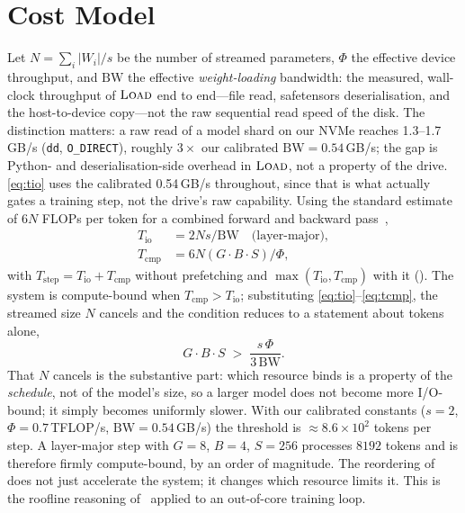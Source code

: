 \documentclass[journal]{IEEEtran}
\begin{document}
\section{Cost Model}
\label{sec:cost}

Let $N = \sum_i |W_i| / s$ be the number of streamed parameters, $\Phi$ the effective device
throughput, and $\mathrm{BW}$ the effective \emph{weight-loading} bandwidth: the measured, wall-clock
throughput of $\textsc{Load}$ end to end---file read, safetensors deserialisation, and the
host-to-device copy---not the raw sequential read speed of the disk. The distinction matters: a raw
read of a model shard on our NVMe reaches 1.3--1.7\,GB/s (\texttt{dd}, \texttt{O\_DIRECT}), roughly
$3\times$ our calibrated $\mathrm{BW}=0.54$\,GB/s; the gap is Python- and
deserialisation-side overhead in $\textsc{Load}$, not a property of the drive. \eqref{eq:tio}
uses the calibrated 0.54\,GB/s throughout, since that is what actually gates a training step, not
the drive's raw capability.
Using the standard estimate of $6N$ FLOPs
per token for a combined forward and backward pass~\cite{kaplan2020scaling},
\begin{align}
T_{\text{io}}  &= 2Ns/\mathrm{BW} \quad \text{(layer-major)}, \label{eq:tio}\\
T_{\text{cmp}} &= 6N (G\cdot B\cdot S)/\Phi, \label{eq:tcmp}
\end{align}
with $T_{\text{step}} = T_{\text{io}} + T_{\text{cmp}}$ without prefetching and
$\max(T_{\text{io}}, T_{\text{cmp}})$ with it (). The system is compute-bound
when $T_{\text{cmp}} > T_{\text{io}}$; substituting \eqref{eq:tio}--\eqref{eq:tcmp}, the streamed
size $N$ cancels and the condition reduces to a statement about tokens alone,
\begin{equation}
\label{eq:regime}
G\cdot B\cdot S \;>\; \frac{s\,\Phi}{3\,\mathrm{BW}} .
\end{equation}
That $N$ cancels is the substantive part: which resource binds is a property of the \emph{schedule},
not of the model's size, so a larger model does not become more I/O-bound; it simply becomes uniformly
slower. With our calibrated constants ($s=2$, $\Phi = 0.7$\,TFLOP/s, $\mathrm{BW}=0.54$\,GB/s) the
threshold is $\approx 8.6\times 10^{2}$ tokens per step. A layer-major step with $G=8$, $B=4$,
$S=256$ processes $8192$ tokens and is therefore firmly compute-bound, by an order of
magnitude. The reordering of  does not just accelerate the system; it changes which
resource limits it. This is the roofline reasoning of~\cite{williams2009roofline} applied to an
out-of-core training loop.
\end{document}

